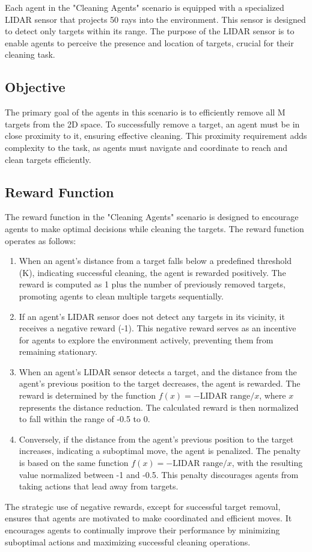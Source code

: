 \documentclass{scrartcl}
\begin{document}
Each agent in the "Cleaning Agents" scenario is equipped with a specialized LIDAR sensor that projects 50 rays into the environment. This sensor is designed to detect only targets within its range. The purpose of the LIDAR sensor is to enable agents to perceive the presence and location of targets, crucial for their cleaning task.

\subsection{Objective}

The primary goal of the agents in this scenario is to efficiently remove all M targets from the 2D space. To successfully remove a target, an agent must be in close proximity to it, ensuring effective cleaning. This proximity requirement adds complexity to the task, as agents must navigate and coordinate to reach and clean targets efficiently.

\subsection{Reward Function}

The reward function in the "Cleaning Agents" scenario is designed to encourage agents to make optimal decisions while cleaning the targets. The reward function operates as follows:
\begin{enumerate}
  \item When an agent's distance from a target falls below a predefined threshold (K), indicating successful cleaning, the agent is rewarded positively. The reward is computed as 1 plus the number of previously removed targets, promoting agents to clean multiple targets sequentially.
  \item If an agent's LIDAR sensor does not detect any targets in its vicinity, it receives a negative reward (-1). This negative reward serves as an incentive for agents to explore the environment actively, preventing them from remaining stationary.
  \item When an agent's LIDAR sensor detects a target, and the distance from the agent's previous position to the target decreases, the agent is rewarded. The reward is determined by the function $f(x) = -\text{LIDAR range}/x$, where $x$ represents the distance reduction. The calculated reward is then normalized to fall within the range of -0.5 to 0.
  \item Conversely, if the distance from the agent's previous position to the target increases, indicating a suboptimal move, the agent is penalized. The penalty is based on the same function $f(x) = -\text{LIDAR range}/x$, with the resulting value normalized between -1 and -0.5. This penalty discourages agents from taking actions that lead away from targets.
\end{enumerate}
The strategic use of negative rewards, except for successful target removal, ensures that agents are motivated to make coordinated and efficient moves. It encourages agents to continually improve their performance by minimizing suboptimal actions and maximizing successful cleaning operations.
\end{document}
